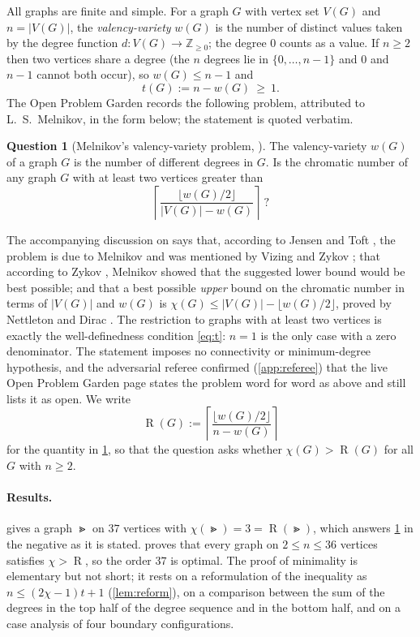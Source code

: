 \documentclass[11pt,a4paper]{article}
\theoremstyle{plain}
\theoremstyle{definition}
\newtheorem{question}[theorem]{Question}
\theoremstyle{remark}
\newcommand{\Z}{\mathbb Z}
\newcommand{\fl}[1]{\lfloor #1\rfloor}
\newcommand{\RHS}{\operatorname{R}}
\begin{document}
All graphs are finite and simple. For a graph $G$ with vertex set $V(G)$ and $n=|V(G)|$, the \emph{valency-variety} $w(G)$ is the number of distinct values taken by the degree function $d\colon V(G)\to\Z_{\ge0}$; the degree $0$ counts as a value. If $n\ge2$ then two vertices share a degree (the $n$ degrees lie in $\{0,\dots,n-1\}$ and $0$ and $n-1$ cannot both occur), so $w(G)\le n-1$ and
\begin{equation}\label{eq:t}
t(G):=n-w(G)\ \ge\ 1 .
\end{equation}
The Open Problem Garden \cite{OPG} records the following problem, attributed to L.~S.~Melnikov, in the form below; the statement is quoted verbatim.

\begin{question}[{Melnikov's valency-variety problem, \cite{OPG}}]\label{q:mel}
The valency-variety $w(G)$ of a graph $G$ is the number of different degrees in $G$. Is the chromatic number of any graph $G$ with at least two vertices greater than
\[
\left\lceil \frac{\lfloor w(G)/2\rfloor}{|V(G)|-w(G)} \right\rceil\ ?
\]
\end{question}

The accompanying discussion on \cite{OPG} says that, according to Jensen and Toft \cite[p.~90]{JT}, the problem is due to Melnikov and was mentioned by Vizing \cite{V} and Zykov \cite{Z}; that according to Zykov \cite{Z}, Melnikov showed that the suggested lower bound would be best possible; and that a best possible \emph{upper} bound on the chromatic number in terms of $|V(G)|$ and $w(G)$ is $\chi(G)\le |V(G)|-\fl{w(G)/2}$, proved by Nettleton \cite{N} and Dirac \cite{D}. The restriction to graphs with at least two vertices is exactly the well-definedness condition \eqref{eq:t}: $n=1$ is the only case with a zero denominator. The statement imposes no connectivity or minimum-degree hypothesis, and the adversarial referee confirmed (\cref{app:referee}) that the live Open Problem Garden page states the problem word for word as above and still lists it as open. We write
\[
\RHS(G):=\left\lceil \frac{\fl{w(G)/2}}{n-w(G)} \right\rceil
\]
for the quantity in \cref{q:mel}, so that the question asks whether $\chi(G)>\RHS(G)$ for all $G$ with $n\ge2$.

\paragraph{Results.}  gives a graph $\Gt$ on $37$ vertices with $\chi(\Gt)=3=\RHS(\Gt)$, which answers \cref{q:mel} in the negative as it is stated.  proves that every graph on $2\le n\le36$ vertices satisfies $\chi>\RHS$, so the order $37$ is optimal. The proof of minimality is elementary but not short; it rests on a reformulation of the inequality as $n\le(2\chi-1)t+1$ (\cref{lem:reform}), on a comparison between the sum of the degrees in the top half of the degree sequence and in the bottom half, and on a case analysis of four boundary configurations.
\end{document}
